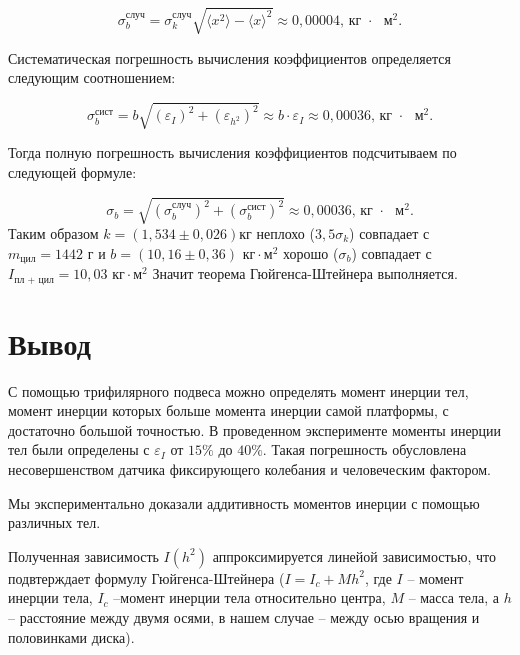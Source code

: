 \documentclass[a4paper,14pt]{extarticle}
\begin{document}
	\begin{equation}
		\sigma_b^\text{случ}= \sigma_k^\text{случ} \sqrt{\langle x^2 \rangle - \langle x \rangle^2} \approx 0,00004
		\text{,  кг $\cdot$ $\text{м}^2$}.
	\end{equation}
	
	Систематическая погрешность вычисления коэффициентов определяется следующим соотношением:
	
	\begin{equation}
		\sigma^\text{сист}_b = b\sqrt{\left( \varepsilon_{I} \right)^2 + \left( \varepsilon_{h^2} \right)^2 } \approx b \cdot \varepsilon_I \approx 0,00036 \text{,  кг $\cdot$ $\text{м}^2$}.
	\end{equation}
	
	Тогда полную погрешность вычисления коэффициентов подсчитываем по следующей формуле:
	
	\begin{equation}
		\sigma_b = \sqrt{\left( \sigma_b^\text{случ} \right)^2 + \left( \sigma_b^\text{сист} \right)^2 } \approx 0,00036 \text{,  кг $\cdot$ $\text{м}^2$}.
	\end{equation}
	Таким образом $k = (1,534 \pm 0,026)\text{кг}$ неплохо ($3,5\sigma_k$) совпадает с $m_\text{цил} = 1442 \text{ г}$ и $b = (10,16 \pm 0,36)\text{ кг} \cdot \text{м}^2$ хорошо ($\sigma_b$) совпадает с $I_\text{пл + цил} = 10,03\text{ кг} \cdot \text{м}^2 $
	Значит теорема Гюйгенса-Штейнера выполняется.
	\section{Вывод}
	
	С помощью трифилярного подвеса можно определять момент инерции тел, момент инерции которых больше момента инерции самой платформы, с достаточно большой точностью. В проведенном эксперименте моменты инерции тел были определены с $\varepsilon_I$ от $15\%$ до $40\%$. Такая погрешность обусловлена несовершенством датчика фиксирующего колебания и человеческим фактором.
	
	Мы экспериментально доказали аддитивность моментов инерции с помощью различных тел.
	
	Полученная зависимость $I(h^2)$ аппроксимируется линейой зависимостью, что подвтерждает формулу Гюйгенса-Штейнера ($I = I_c + Mh^2$, где $I$ -- момент инерции тела, $I_c$ --момент инерции тела относительно центра, $M$ -- масса тела, а $h$ -- расстояние между двумя осями, в нашем случае -- между осью вращения и половинками диска).
	
\end{document}
